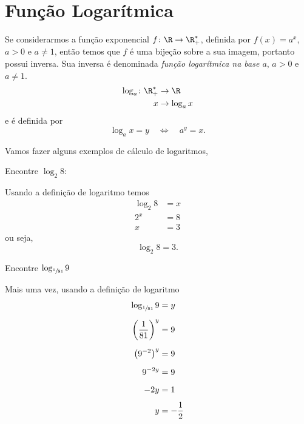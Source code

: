 \section{Função Logarítmica}

Se considerarmos a função exponencial
$f\colon \R \to \R_+^*$,
definida por $f(x) = a^x$, $a>0$ e $a \neq 1$, então temos
que $f$ é uma bijeção sobre a sua imagem, portanto possui inversa.
Sua inversa é denominada
\emph{função logarítmica na base $a$},
$a > 0$ e $a \neq 1$.
\begin{align*}
  \log_a\colon \R_{+}^{*} & \to \R        \\
  x                       & \to \log_a x
\end{align*}
e é definida por
\[
  \log_a x = y
  \quad\Leftrightarrow\quad
  a^y = x.
\]

Vamos fazer alguns exemplos de cálculo de logaritmos,

\begin{example}
  Encontre $\log_2 8$:

  \solution
  Usando a definição de logaritmo temos
  \begin{align*}
    \log_2 8 & = x \\
    2^x      & = 8 \\
    x        & = 3
  \end{align*}
  ou seja,
  \[
    \log_2 8 = 3.
  \]
\end{example}

\begin{example}
  Encontre \(\log_{\sfrac{1}{81}} 9\)

  \solution
  Mais uma vez, usando a definição de logaritmo
  \begin{align*}
    \log_{\sfrac{1}{81}}9          & = y  \\[2mm]
    \left( \frac{1}{81} \right)^y  & = 9  \\[2mm]
    \left(9^{-2}\right)^y          & = 9  \\[2mm]
    9^{-2y}                        & = 9  \\[2mm]
    -2y                            & = 1  \\[2mm]
    y                              & = -\frac{1}{2}
  \end{align*}
\end{example}

